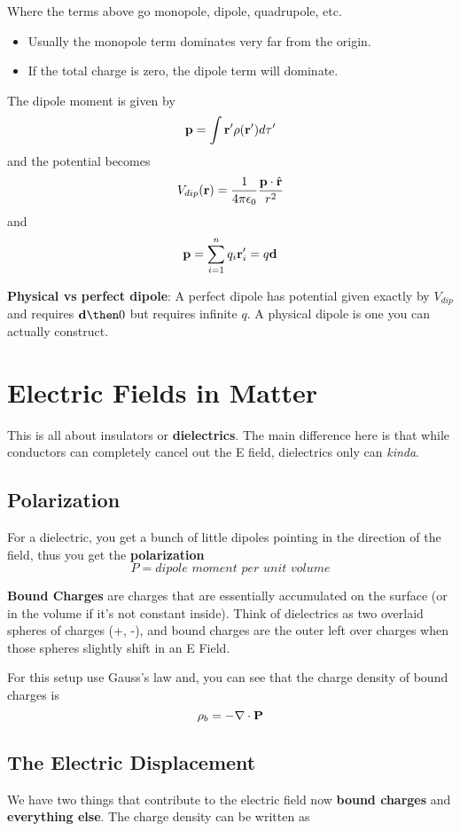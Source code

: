 \documentclass{article}
\newcommand{\vh}[1]{\hat{\vb{#1}}}
\newcommand{\ck}{\frac{1}{4\pi\epsilon_0}}
\begin{document}
Where the terms above go monopole, dipole, quadrupole, etc.

\begin{itemize}
    \item Usually the monopole term dominates very far from the origin.
    \item If the total charge is zero, the dipole term will dominate.
\end{itemize}

The dipole moment is given by 
$$
\vb{p} = \int \vb{r}' \rho(\vb{r}') d\tau'
$$
and the potential becomes
$$
V_{dip}(\vb{r}) = \ck \frac{\vb{p} \cdot \vh{r}}{r^2}
$$
and
$$
\vb{p} = \sum_{i=1}^n q_i \vb{r}'_i = q\vb{d}
$$

\textbf{Physical vs perfect dipole}: A perfect dipole has potential given exactly by $V_{dip}$ and requires $\vb{d} \then 0$ but requires infinite $q$.  A physical dipole is one you can actually construct.

\section{Electric Fields in Matter}
This is all about insulators or \textbf{dielectrics}.  The main difference here is that while conductors can completely cancel out the E field, dielectrics only can \textit{kinda}.

\subsection{Polarization}
For a dielectric, you get a bunch of little dipoles pointing in the direction of the field, thus you get the \textbf{polarization}
$$
P = \textit{dipole moment per unit volume}
$$

\textbf{Bound Charges} are charges that are essentially accumulated on the surface (or in the volume if it's not constant inside).  Think of dielectrics as two overlaid spheres of charges (+, -), and bound charges are the outer left over charges when those spheres slightly shift in an E Field.

For this setup use Gauss's law and, you can see that the charge density of bound charges is
$$
\rho_b = -\nabla \cdot \vb{P}
$$

\subsection{The Electric Displacement}
We have two things that contribute to the electric field now \textbf{bound charges} and \textbf{everything else}.  The charge density can be written as
\end{document}
